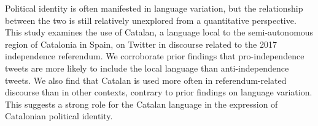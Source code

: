Political identity is often manifested in language variation, but the relationship between the two is still relatively unexplored from a quantitative perspective. This study examines the use of Catalan, a language local to the semi-autonomous region of Catalonia in Spain, on Twitter in discourse related to the 2017 independence referendum. We corroborate prior findings that pro-independence tweets are more likely to include the local language than anti-independence tweets. We also find that Catalan is used more often in referendum-related discourse than in other contexts, contrary to prior findings on language variation. This suggests a strong role for the Catalan language in the expression of Catalonian political identity.
